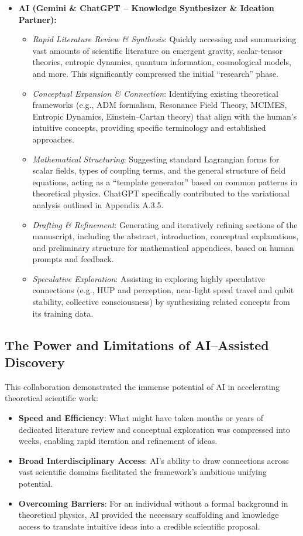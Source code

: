\documentclass[11pt,a4paper]{article} %
\begin{document}
\begin{itemize}
  \item \textbf{AI (Gemini \& ChatGPT – Knowledge Synthesizer \& Ideation Partner):}
    \begin{itemize}
      \item \emph{Rapid Literature Review \& Synthesis}: Quickly accessing and summarizing vast amounts of scientific literature on emergent gravity, scalar-tensor theories, entropic dynamics, quantum information, cosmological models, and more. This significantly compressed the initial “research” phase.
      \item \emph{Conceptual Expansion \& Connection}: Identifying existing theoretical frameworks (e.g., ADM formalism, Resonance Field Theory, MCIMES, Entropic Dynamics, Einstein–Cartan theory) that align with the human’s intuitive concepts, providing specific terminology and established approaches.
      \item \emph{Mathematical Structuring}: Suggesting standard Lagrangian forms for scalar fields, types of coupling terms, and the general structure of field equations, acting as a “template generator” based on common patterns in theoretical physics. ChatGPT specifically contributed to the variational analysis outlined in Appendix A.3.5.
      \item \emph{Drafting \& Refinement}: Generating and iteratively refining sections of the manuscript, including the abstract, introduction, conceptual explanations, and preliminary structure for mathematical appendices, based on human prompts and feedback.
      \item \emph{Speculative Exploration}: Assisting in exploring highly speculative connections (e.g., HUP and perception, near-light speed travel and qubit stability, collective consciousness) by synthesizing related concepts from its training data.
    \end{itemize}
\end{itemize}

\subsection{The Power and Limitations of AI–Assisted Discovery}

This collaboration demonstrated the immense potential of AI in accelerating theoretical scientific work:

\begin{itemize}
  \item \textbf{Speed and Efficiency}: What might have taken months or years of dedicated literature review and conceptual exploration was compressed into weeks, enabling rapid iteration and refinement of ideas.
  \item \textbf{Broad Interdisciplinary Access}: AI’s ability to draw connections across vast scientific domains facilitated the framework’s ambitious unifying potential.
  \item \textbf{Overcoming Barriers}: For an individual without a formal background in theoretical physics, AI provided the necessary scaffolding and knowledge access to translate intuitive ideas into a credible scientific proposal.
\end{itemize}
\end{document}
